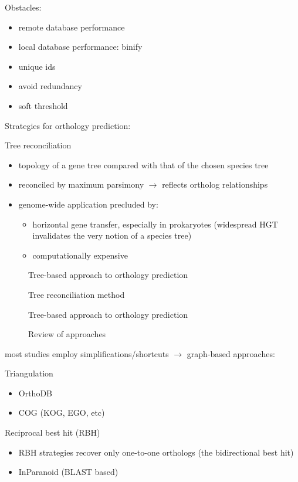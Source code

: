 Obstacles:
\begin{itemize}
	\item remote database performance
	\item local database performance: binify
	\item unique ids
	\item avoid redundancy
	\item soft threshold
\end{itemize}

Strategies for orthology prediction:

Tree reconciliation

\begin{itemize}
	\item topology of a gene tree compared with that of the chosen species tree
	\item reconciled by maximum parsimony $\rightarrow$ reflects ortholog
		relationships
	\item genome-wide application precluded by:
	\begin{itemize}
		\item horizontal gene transfer, especially in prokaryotes (widespread HGT
			invalidates the very notion of a species tree)
		\item computationally expensive
	\end{itemize}
\end{itemize}

\begin{description}
	\item[\cite{mirkin1995}] Tree-based approach to orthology prediction
	\item[\cite{page1998}] Tree reconciliation method
	\item[\cite{yuan1998}] Tree-based approach to orthology prediction
	\item[\cite{kuzniar2008}] Review of approaches
\end{description}

most studies employ simplifications/shortcuts $\rightarrow$ graph-based approaches:

Triangulation

\begin{itemize}
	\item OrthoDB 
	\item COG (KOG, EGO, etc)
\end{itemize}

Reciprocal best hit (RBH) 

\begin{itemize}
	\item RBH strategies recover only one-to-one orthologs (the bidirectional best
		hit)
	\item InParanoid (BLAST based)
\end{itemize}

